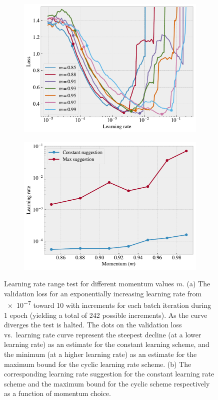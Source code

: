 \begin{figure}[!htb]
  \centering
  \begin{subfigure}[t]{0.49\textwidth}
      \centering
      \includegraphics[width=\textwidth]{figures/ML/LR_momentum_test_a.pdf}
      \caption{}
  \end{subfigure}
  \hfill
  \begin{subfigure}[t]{0.49\textwidth}
      \centering
      \includegraphics[width=\textwidth]{figures/ML/LR_momentum_test_b.pdf}
      \caption{}
  \end{subfigure}
  \hfill
  \caption{Learning rate range test for different momentum values $m$. (a) The validation loss for an exponentially increasing learning rate from \num{e-7} toward 10 with increments for each batch iteration during 1 epoch (yielding a total of 242 possible increments). As the curve diverges the test is halted. The dots on the validation loss vs.\ learning rate curve represent the steepest decline (at a lower learning rate) as an estimate for the constant learning scheme, and the minimum (at a higher learning rate) as an estimate for the maximum bound for the cyclic learning rate scheme. (b) The corresponding learning rate suggestion for the constant learning rate scheme and the maximum bound for the cyclic scheme respectively as a function of momentum choice. }
  \label{fig:LR_range_mom}
\end{figure}
